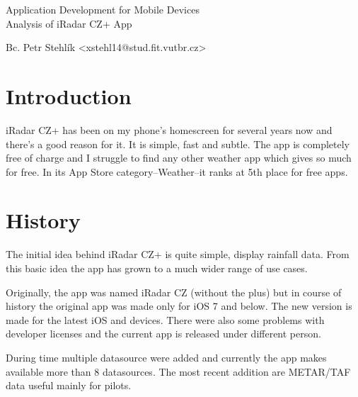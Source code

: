 \documentclass[11pt,a4paper]{article}
\begin{document}
\begin{center}
	\LARGE{Application Development for Mobile Devices}\\
	\Large{Analysis of iRadar CZ+ App}
	\vspace{0.5cm}

    \begin{centering}
    \small{
        Bc. Petr Stehlík <xstehl14@stud.fit.vutbr.cz>
        }
    \end{centering}

	\vspace{0.2cm}

\end{center}


\section{Introduction}

iRadar CZ+\cite{iradarplus} has been on my phone's homescreen for several years now and there's a good reason for it. It is simple, fast and subtle. The app is completely free of charge and I struggle to find any other weather app which gives so much for free. In its App Store category--Weather--it ranks at 5th place for free apps.

\section{History}
The initial idea behind iRadar CZ+ is quite simple, display rainfall data. From this basic idea the app has grown to a much wider range of use cases.

Originally, the app was named iRadar CZ\cite{iradar} (without the plus) but in course of history the original app was made only for iOS 7 and below. The new version is made for the latest iOS and devices. There were also some problems with developer licenses and the current app is released under different person.

During time multiple datasource were added and currently the app makes available more than 8 datasources. The most recent addition are METAR/TAF\cite{metar} data useful mainly for pilots.
\end{document}
